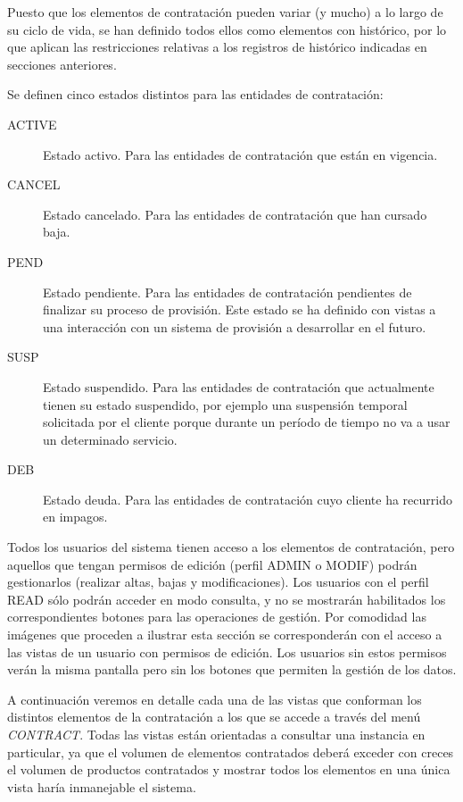 Puesto que los elementos de contratación pueden variar (y mucho) a lo largo de su ciclo de vida, se han definido todos ellos como elementos con histórico, por lo que aplican las restricciones relativas a los registros de histórico indicadas en secciones anteriores.

Se definen cinco estados distintos para las entidades de contratación:
\begin{description}
\item[ACTIVE] Estado activo. Para las entidades de contratación que están en vigencia.
\item[CANCEL] Estado cancelado. Para las entidades de contratación que han cursado baja.
\item[PEND] Estado pendiente. Para las entidades de contratación pendientes de finalizar su proceso de provisión. Este estado se ha definido con vistas a una interacción con un sistema de provisión a desarrollar en el futuro.
\item[SUSP] Estado suspendido. Para las entidades de contratación que actualmente tienen su estado suspendido, por ejemplo una suspensión temporal solicitada por el cliente porque durante un período de tiempo no va a usar un determinado servicio.
\item[DEB] Estado deuda. Para las entidades de contratación cuyo cliente ha recurrido en impagos.
\end{description}


Todos los usuarios del sistema tienen acceso a los elementos de contratación, pero aquellos que tengan permisos de edición (perfil ADMIN o MODIF) podrán gestionarlos (realizar altas, bajas y modificaciones). Los usuarios con el perfil READ sólo podrán acceder en modo consulta, y no se mostrarán habilitados los correspondientes botones para las operaciones de gestión. Por comodidad las imágenes que proceden a ilustrar esta sección se corresponderán con el acceso a las vistas de un usuario con permisos de edición. Los usuarios sin estos permisos verán la misma pantalla pero sin los botones que permiten la gestión de los datos.

A continuación veremos en detalle cada una de las vistas que conforman los distintos elementos de la contratación a los que se accede a través del menú  \emph{CONTRACT}. Todas las vistas están orientadas a consultar una instancia en particular, ya que el volumen de elementos contratados deberá exceder con creces el volumen de productos contratados y mostrar todos los elementos en una única vista haría inmanejable el sistema.



